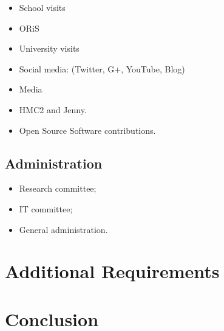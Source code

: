 \documentclass{article}
\begin{document}
\begin{itemize}
    \item School visits
    \item ORiS
    \item University visits
    \item Social media: (Twitter, G+, YouTube, Blog)
    \item Media
    \item HMC2 and Jenny.
    \item Open Source Software contributions.
\end{itemize}


\subsection{Administration}

\begin{itemize}
    \item Research committee;
    \item IT committee;
    \item General administration.
\end{itemize}

\section{Additional Requirements}\label{sec:additional}
\section{Conclusion}\label{sec:conclusion}

\newpage


\end{document}
